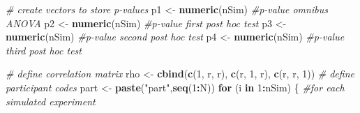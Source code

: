 \documentclass[]{book}
\newenvironment{Shaded}{\begin{snugshade}}{\end{snugshade}}
\newcommand{\CommentTok}[1]{\textcolor[rgb]{0.56,0.35,0.01}{\textit{#1}}}
\newcommand{\ControlFlowTok}[1]{\textcolor[rgb]{0.13,0.29,0.53}{\textbf{#1}}}
\newcommand{\DecValTok}[1]{\textcolor[rgb]{0.00,0.00,0.81}{#1}}
\newcommand{\KeywordTok}[1]{\textcolor[rgb]{0.13,0.29,0.53}{\textbf{#1}}}
\newcommand{\NormalTok}[1]{#1}
\newcommand{\OperatorTok}[1]{\textcolor[rgb]{0.81,0.36,0.00}{\textbf{#1}}}
\newcommand{\StringTok}[1]{\textcolor[rgb]{0.31,0.60,0.02}{#1}}
\begin{document}
\begin{Shaded}
\begin{Highlighting}[]
\CommentTok{# create vectors to store p-values}
\NormalTok{p1 <-}\StringTok{ }\KeywordTok{numeric}\NormalTok{(nSim) }\CommentTok{#p-value omnibus ANOVA}
\NormalTok{p2 <-}\StringTok{ }\KeywordTok{numeric}\NormalTok{(nSim) }\CommentTok{#p-value first post hoc test}
\NormalTok{p3 <-}\StringTok{ }\KeywordTok{numeric}\NormalTok{(nSim) }\CommentTok{#p-value second post hoc test}
\NormalTok{p4 <-}\StringTok{ }\KeywordTok{numeric}\NormalTok{(nSim) }\CommentTok{#p-value third post hoc test}

\CommentTok{# define correlation matrix}
\NormalTok{rho <-}\StringTok{ }\KeywordTok{cbind}\NormalTok{(}\KeywordTok{c}\NormalTok{(}\DecValTok{1}\NormalTok{, r, r), }\KeywordTok{c}\NormalTok{(r, }\DecValTok{1}\NormalTok{, r), }\KeywordTok{c}\NormalTok{(r, r, }\DecValTok{1}\NormalTok{))}
\CommentTok{# define participant codes}
\NormalTok{part <-}\StringTok{ }\KeywordTok{paste}\NormalTok{(}\StringTok{"part"}\NormalTok{,}\KeywordTok{seq}\NormalTok{(}\DecValTok{1}\OperatorTok{:}\NormalTok{N))}
\ControlFlowTok{for}\NormalTok{ (i }\ControlFlowTok{in} \DecValTok{1}\OperatorTok{:}\NormalTok{nSim) \{}
  \CommentTok{#for each simulated experiment}


\end{Highlighting}
\end{Shaded}
\end{document}
